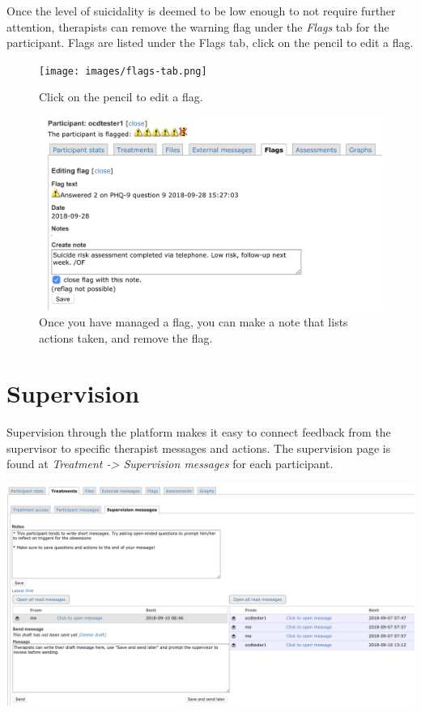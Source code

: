 \documentclass[]{book}
\theoremstyle{definition}
\theoremstyle{definition}
\theoremstyle{definition}
\theoremstyle{remark}
\begin{document}
Once the level of suicidality is deemed to be low enough to not require
further attention, therapists can remove the warning flag under the
\emph{Flags} tab for the participant. Flags are listed under the Flags
tab, click on the pencil to edit a flag.

\begin{figure}
\centering
\texttt{[image: images/flags-tab.png]}
\caption{Click on the pencil to edit a flag.}
\end{figure}

\begin{figure}
\centering
\includegraphics{images/remove-flag.png}
\caption{Once you have managed a flag, you can make a note that lists
actions taken, and remove the flag.}
\end{figure}

\hypertarget{supervision}{%
\section{Supervision}\label{supervision}}

Supervision through the platform makes it easy to connect feedback from
the supervisor to specific therapist messages and actions. The
supervision page is found at \emph{Treatment -\textgreater{} Supervision
messages} for each participant.

\includegraphics{images/supervision.png}
\end{document}
